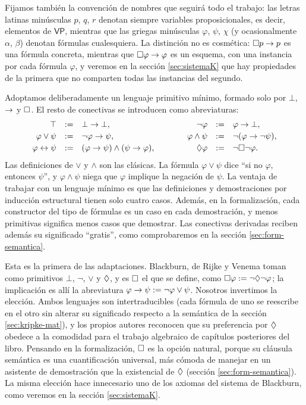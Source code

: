 Fijamos también la convención de nombres que seguirá todo el trabajo: las letras latinas minúsculas $p$, $q$, $r$ denotan siempre variables proposicionales, es decir, elementos de $\mathsf{VP}$, mientras que las griegas minúsculas $\varphi$, $\psi$, $\chi$ (y ocasionalmente $\alpha$, $\beta$) denotan fórmulas cualesquiera. La distinción no es cosmética: $\square p \to p$ es una fórmula concreta, mientras que $\square\varphi \to \varphi$ es un esquema, con una instancia por cada fórmula $\varphi$, y veremos en la sección \ref{sec:sistemaK} que hay propiedades de la primera que no comparten todas las instancias del segundo.

Adoptamos deliberadamente un lenguaje primitivo mínimo, formado solo por $\bot$, $\to$ y $\square$. El resto de conectivas se introducen como abreviaturas:
\[
\begin{array}{rclcrcl}
  \top &:=& \bot \to \bot, &\qquad&
  \lnot\varphi &:=& \varphi \to \bot,\\[2pt]
  \varphi \lor \psi &:=& \lnot\varphi \to \psi, &&
  \varphi \land \psi &:=& \lnot(\varphi \to \lnot\psi),\\[2pt]
  \varphi \leftrightarrow \psi &:=& (\varphi\to\psi)\land(\psi\to\varphi), &&
  \lozenge\varphi &:=& \lnot\square\lnot\varphi.
\end{array}
\]
Las definiciones de $\lor$ y $\land$ son las clásicas. La fórmula $\varphi \lor \psi$ dice ``si no $\varphi$, entonces $\psi$'', y $\varphi \land \psi$ niega que $\varphi$ implique la negación de $\psi$. La ventaja de trabajar con un lenguaje mínimo es que las definiciones y demostraciones por inducción estructural tienen solo cuatro casos. Además, en la formalización, cada constructor del tipo de fórmulas es un caso en cada demostración, y menos primitivas significa menos casos que demostrar. Las conectivas derivadas reciben además su significado ``gratis'', como comprobaremos en la sección \ref{sec:form-semantica}.

Esta es la primera de las adaptaciones. Blackburn, de Rijke y Venema \cite[Def.~1.9]{blackburn} toman como primitivos $\bot$, $\lnot$, $\lor$ y $\lozenge$, y es $\square$ el que se define, como $\square\varphi := \lnot\lozenge\lnot\varphi$; la implicación es allí la abreviatura $\varphi \to \psi := \lnot\varphi \lor \psi$. Nosotros invertimos la elección. Ambos lenguajes son intertraducibles (cada fórmula de uno se reescribe en el otro sin alterar su significado respecto a la semántica de la sección \ref{sec:kripke-mat}), y los propios autores reconocen que su preferencia por $\lozenge$ obedece a la comodidad para el trabajo algebraico de capítulos posteriores del libro. Pensando en la formalización, $\square$ es la opción natural, porque su cláusula semántica es una cuantificación universal, más cómoda de manejar en un asistente de demostración que la existencial de $\lozenge$ (sección \ref{sec:form-semantica}). La misma elección hace innecesario uno de los axiomas del sistema de Blackburn, como veremos en la sección \ref{sec:sistemaK}.

